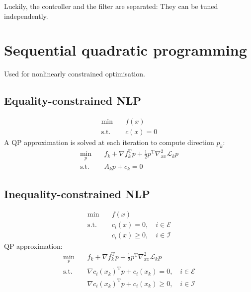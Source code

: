 \documentclass[a4paper, 12pt]{article}
\theoremstyle{definition}
\newcommand{\T}{^{\scriptscriptstyle \text{T}}}
\newcommand{\lagrange}{\mathcal{L}}
\newcommand{\Econ}{\mathcal{E}}
\newcommand{\Icon}{\mathcal{I}}
\begin{document}
Luckily, the controller and the filter are separated: They can be tuned independently.

\section{Sequential quadratic programming}
Used for nonlinearly constrained optimisation. 

\subsection{Equality-constrained NLP}
\begin{subequations}
	\begin{align}
		\min        & \quad f(x) \\
		\text{s.t.} & \quad c(x) = 0
	\end{align}
\end{subequations}
A QP approximation is solved at each iteration to compute direction \(p_k\):
\begin{subequations}
	\begin{align}
		\underset
			{p}
			{\min}
		& \quad
		f_k + \nabla f_k\T p + \frac{1}{2} p\T \nabla_{xx}^2 \lagrange_k p \\
		\text{s.t.}
		& \quad A_k p + c_k = 0
	\end{align}
\end{subequations}

\subsection{Inequality-constrained NLP}
\begin{subequations}
	\begin{align}
		\min        & \quad f(x) \\
		\text{s.t.} & \quad c_i(x) = 0,    \quad i \in \Econ \\
		            & \quad c_i(x) \geq 0, \quad i \in \Icon
	\end{align}
\end{subequations}
QP approximation:
\begin{subequations}
	\begin{align}
		\underset{p}{\min}
			& \quad
				f_k + \nabla f_k\T p + \frac{1}{2} p\T \nabla_{xx}^2 \lagrange_k p \\
		\text{s.t.}
			& \quad
				\nabla c_i (x_k)\T p + c_i (x_k) =    0, \quad i \in \Econ \\
			& \quad
				\nabla c_i (x_k)\T p + c_i (x_k) \geq 0, \quad i \in \Icon
	\end{align}
\end{subequations}
\end{document}
